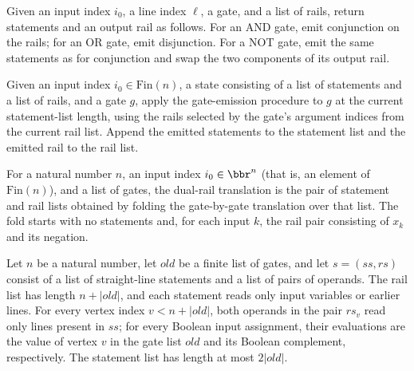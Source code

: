 \begin{definition}
\label{BoolCircuit.StraightLine.gateEmit}
\leanok
{}
Given an input index $i_0$, a line index $\ell$, a gate, and a list of rails, return
statements and an output rail as follows. For an AND gate, emit conjunction on the
rails; for an OR gate, emit disjunction. For a NOT gate, emit the same statements as for
conjunction and swap the two components of its output rail.
\end{definition}

\begin{definition}
\label{BoolCircuit.StraightLine.dualStep}
\leanok
{}
Given an input index $i_0\in\mathrm{Fin}(n)$, a state consisting of a list of statements
and a list of rails, and a gate $g$, apply the gate-emission procedure to $g$ at the
current statement-list length, using the rails selected by the gate’s argument indices
from the current rail list. Append the emitted statements to the statement list and the
emitted rail to the rail list.
\end{definition}

\begin{definition}
\label{BoolCircuit.StraightLine.dualRail}
\leanok
{}
For a natural number $n$, an input index $i_0 \in \bbr^n$ (that is, an element of
$\text{Fin}(n)$), and a list of gates, the dual-rail translation is the pair of statement
and rail lists obtained by folding the gate-by-gate translation over that list. The fold
starts with no statements and, for each input $k$, the rail pair consisting of $x_k$ and
its negation.
\end{definition}

\begin{definition}
\label{BoolCircuit.StraightLine.DualInv}
\leanok
{}
Let $n$ be a natural number, let $old$ be a finite list of gates, and let $s=(ss,rs)$
consist of a list of straight-line statements and a list of pairs of operands. The rail
list has length $n+|old|$, and each statement reads only input variables or earlier
lines. For every vertex index $v<n+|old|$, both operands in the pair $rs_v$ read only
lines present in $ss$; for every Boolean input assignment, their evaluations are the
value of vertex $v$ in the gate list $old$ and its Boolean complement, respectively. The
statement list has length at most $2|old|$.
\end{definition}

